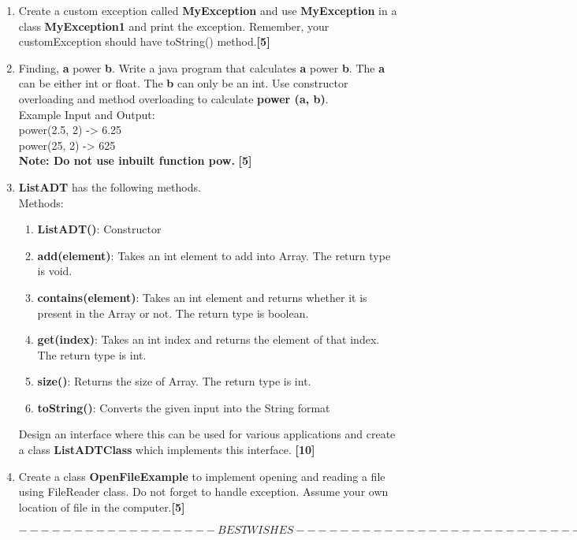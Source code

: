 \documentclass[12pt,a4paper]{exam}
\begin{document}
    \begin{enumerate}[start=1,label={\bfseries Q\arabic*)}]
    	\item Create a custom exception called \textbf{MyException} and use \textbf{MyException} in a class \textbf{MyException1} and print the exception. Remember, your customException should have toString() method.\hfill\textbf{[5]}  	
    	\item Finding, \textbf{a} power \textbf{b}.  Write a java program that calculates \textbf{a} power \textbf{b}.  The \textbf{a} can be either int or float. The \textbf{b} can only be an int. Use constructor overloading and method overloading to calculate \textbf{power (a, b)}.\\
    	Example Input and Output:\\
    	power(2.5, 2) -> 6.25 \\power(25, 2) -> 625\\
    	\textbf{Note: Do not use inbuilt function pow.}  \hfill\textbf{[5]}
    	\item  \textbf{ListADT} has the following methods. \\
    	
    	Methods:
    	\begin{enumerate}
    		\item  \textbf{ListADT()}: Constructor
    		\item \textbf{add(element)}: Takes an int element to add into Array. The return type is void.
    		\item \textbf{contains(element)}: Takes an int element and returns whether it is present in the Array or not. The return type is boolean.
    		\item \textbf{get(index)}: Takes an int index and returns the element of that index. The return type is int.
    		\item \textbf{size()}: Returns the size of Array. The return type is int.
    		\item \textbf{toString()}: Converts the given input into the String format
    	\end{enumerate}
    	Design an interface where this can be used for various applications and create a class \textbf{ListADTClass} which implements this interface. 
    	\hfill\textbf{[10]} 
    	\item Create a class \textbf{OpenFileExample} to implement opening and reading a file using FileReader class. Do not forget to handle exception. Assume your own location of file in the computer.\hfill\textbf{[5]}
    	
    	
    	
    	$------------ ------BEST WISHES----------------------------$
    \end{enumerate}
    
    
\end{document}
